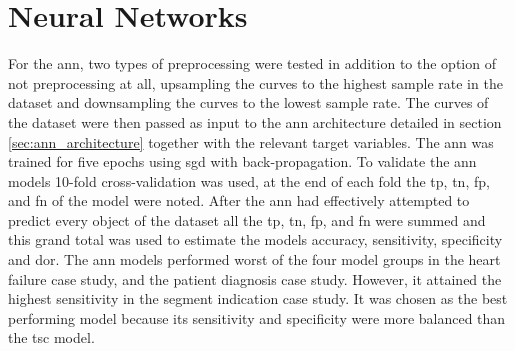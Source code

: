 \section{Neural Networks}
For the \acrshort{ann}, two types of preprocessing were tested in addition to the option of not preprocessing at all, upsampling the curves to the highest sample rate in the dataset and downsampling the curves to the lowest sample rate. The curves of the dataset were then passed as input to the \acrshort{ann} architecture detailed in section \ref{sec:ann_architecture} together with the relevant target variables. The \acrshort{ann} was trained for five epochs using \acrshort{sgd} with back-propagation. To validate the \acrshort{ann} models 10-fold cross-validation was used, at the end of each fold the \acrshort{tp}, \acrshort{tn}, \acrshort{fp}, and \acrshort{fn} of the model were noted. After the \acrshort{ann} had effectively attempted to predict every object of the dataset all the \acrshort{tp}, \acrshort{tn}, \acrshort{fp}, and \acrshort{fn} were summed and this grand total was used to estimate the models accuracy, sensitivity, specificity and \acrshort{dor}. \bigskip
The \acrshort{ann} models performed worst of the four model groups in the heart failure case study, and the patient diagnosis case study. However, it attained the highest sensitivity in the segment indication case study. It was chosen as the best performing model because its sensitivity and specificity were more balanced than the \acrshort{tsc} model.
